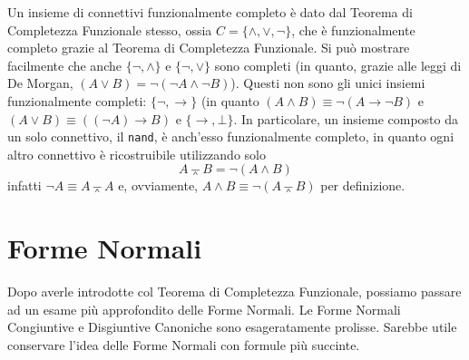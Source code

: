 Un insieme di connettivi funzionalmente 
completo è dato dal Teorema di Completezza Funzionale stesso, ossia 
$C = \{\land, \lor, \neg\}$, che è funzionalmente completo grazie 
al Teorema di Completezza Funzionale. Si può mostrare facilmente che 
anche $\{\neg, \land\}$ e $\{\neg, \lor\}$ sono completi (in quanto, grazie alle 
leggi di De Morgan, $(A \lor B) = \neg (\neg A \land \neg B)$). Questi non 
sono gli unici insiemi funzionalmente completi: 
$\{\neg, \rightarrow\}$ (in quanto $(A \land B) \equiv \neg (A \rightarrow \neg B)$ 
e $(A \lor B) \equiv ((\neg A) \rightarrow B)$ 
e $\{\rightarrow, \bot\}$. In particolare, un insieme composto da un 
solo connettivo, il \texttt{nand}, è anch'esso funzionalmente completo, 
in quanto ogni altro connettivo è ricostruibile utilizzando solo 
$$
A \barwedge B = \neg (A \land B)
$$
infatti $\neg A \equiv A \barwedge A$ e, ovviamente, $A \land B \equiv \neg ( A \barwedge B)$ 
per definizione. 

\section{Forme Normali}
Dopo averle introdotte col Teorema di Completezza Funzionale, possiamo 
passare ad un esame più approfondito delle Forme Normali.
Le Forme Normali Congiuntive e Disgiuntive Canoniche sono 
esageratamente prolisse. Sarebbe utile conservare l'idea delle Forme Normali 
con formule più succinte. 

